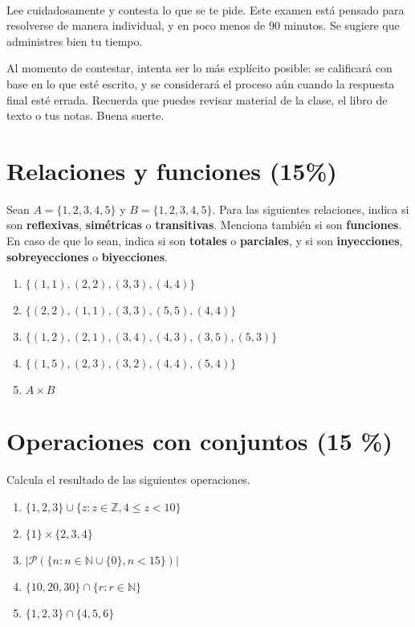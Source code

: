 \documentclass[8pt, onside]{article}
\title{
    \myclass \\
    \textbf{\mytitle} \\
    \myheader
    \date{}
}
\begin{document}
\maketitle

\vspace{-1.5cm}

Lee cuidadosamente y contesta lo que se te pide.
Este examen está pensado para resolverse de manera individual, y en poco menos de 90 minutos.
Se sugiere que administres bien tu tiempo.

Al momento de contestar, intenta ser lo más explícito posible: se calificará con base en lo que esté escrito, y se considerará el proceso aún cuando la respuesta final esté errada.
Recuerda que puedes revisar material de la clase, el libro de texto o tus notas.
Buena suerte.

\section{Relaciones y funciones (15\%)}

Sean $A = \{1,2,3,4,5\}$ y $B = \{1,2,3,4,5\}$.
Para las siguientes relaciones, indica si son \textbf{reflexivas}, \textbf{simétricas} o \textbf{transitivas}.
Menciona también si son \textbf{funciones}. En caso de que lo sean, indica si son \textbf{totales} o \textbf{parciales}, y si son \textbf{inyecciones}, \textbf{sobreyecciones} o \textbf{biyecciones}.

\begin{enumerate}[label=\tt \alph*)]
    \itemsep0em
    \item $\{(1,1), (2,2), (3,3), (4,4)\}$
    \item $\{(2,2), (1,1), (3,3), (5,5), (4,4)\}$
    \item $\{(1,2), (2,1), (3,4), (4,3), (3,5), (5,3)\}$
    \item $\{(1,5), (2,3), (3,2), (4,4), (5, 4)\}$
    \item $A \times B$
\end{enumerate}


\section{Operaciones con conjuntos (15 \%)}

Calcula el resultado de las siguientes operaciones.

\begin{enumerate}[label=\tt \alph*)]
    \itemsep0em
    \item $\{1, 2, 3\} \cup \{z : z \in \mathbb{Z}, 4 \leq z < 10 \}$
    \item $\{1\} \times \{2,3,4\}$
    \item $|\mathscr{P}(\{n : n \in \mathbb{N} \cup \{0\}, n < 15\})|$
    \item $\{10, 20, 30\} \cap \{r : r \in \mathbb{N}\}$
    \item $\{1, 2, 3\} \cap \{4, 5, 6\}$
\end{enumerate}
\end{document}
